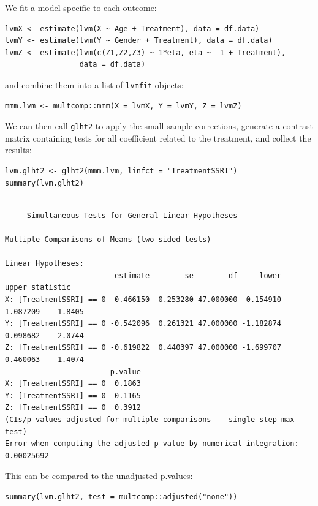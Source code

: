 \documentclass[12pt]{article}
\begin{document}
We fit a model specific to each outcome:
\lstset{language=r,label= ,caption= ,captionpos=b,numbers=none}
\begin{lstlisting}
lvmX <- estimate(lvm(X ~ Age + Treatment), data = df.data)
lvmY <- estimate(lvm(Y ~ Gender + Treatment), data = df.data)
lvmZ <- estimate(lvm(c(Z1,Z2,Z3) ~ 1*eta, eta ~ -1 + Treatment), 
                 data = df.data)
\end{lstlisting}

and combine them into a list of \texttt{lvmfit} objects:
\lstset{language=r,label= ,caption= ,captionpos=b,numbers=none}
\begin{lstlisting}
mmm.lvm <- multcomp::mmm(X = lvmX, Y = lvmY, Z = lvmZ)
\end{lstlisting}

We can then call \texttt{glht2} to apply the small sample corrections,
generate a contrast matrix containing tests for all coefficient
related to the treatment, and collect the results:
\lstset{language=r,label= ,caption= ,captionpos=b,numbers=none}
\begin{lstlisting}
lvm.glht2 <- glht2(mmm.lvm, linfct = "TreatmentSSRI")
summary(lvm.glht2)
\end{lstlisting}

\begin{verbatim}

	 Simultaneous Tests for General Linear Hypotheses

Multiple Comparisons of Means (two sided tests) 

Linear Hypotheses:
                         estimate        se        df     lower     upper statistic
X: [TreatmentSSRI] == 0  0.466150  0.253280 47.000000 -0.154910  1.087209    1.8405
Y: [TreatmentSSRI] == 0 -0.542096  0.261321 47.000000 -1.182874  0.098682   -2.0744
Z: [TreatmentSSRI] == 0 -0.619822  0.440397 47.000000 -1.699707  0.460063   -1.4074
                        p.value
X: [TreatmentSSRI] == 0  0.1863
Y: [TreatmentSSRI] == 0  0.1165
Z: [TreatmentSSRI] == 0  0.3912
(CIs/p-values adjusted for multiple comparisons -- single step max-test) 
Error when computing the adjusted p-value by numerical integration: 0.00025692
\end{verbatim}

This can be compared to the unadjusted p.values:
\lstset{language=r,label= ,caption= ,captionpos=b,numbers=none}
\begin{lstlisting}
summary(lvm.glht2, test = multcomp::adjusted("none"))
\end{lstlisting}
\end{document}
